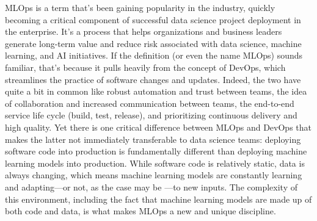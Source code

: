 MLOps is a term that's been gaining popularity in the industry, quickly becoming a critical component of successful
data science project deployment in the enterprise. It's a process that helps organizations and business leaders
generate long-term value and reduce risk associated with data science, machine learning, and AI initiatives. If the
definition (or even the name MLOps) sounds familiar, that's because it pulls heavily from the concept of DevOps,
which streamlines the practice of software changes and updates. Indeed, the two have quite a bit in common like
robust automation and trust between teams, the idea of collaboration and increased communication between teams, the
end-to-end service life cycle (build, test, release), and prioritizing continuous delivery and high quality. Yet
there is one critical difference between MLOps and DevOps that makes the latter not immediately transferable to data
science teams: deploying software code into production is fundamentally different than deploying machine learning
models into production. While software code is relatively static, data is always changing, which means machine
learning models are constantly learning and adapting—or not, as the case may be —to new inputs. The complexity of
this environment, including the fact that machine learning models are made up of both code and data, is what makes
MLOps a new and unique discipline.